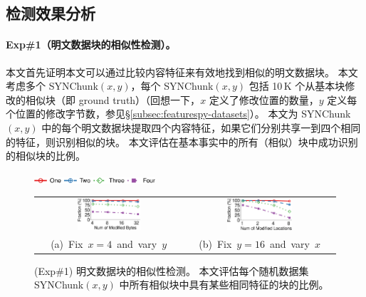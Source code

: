 \subsection{检测效果分析}
\label{subsec:featurespy-evaluation-detection}



\paragraph*{Exp\#1（明文数据块的相似性检测）。}
本文首先证明本文可以通过比较内容特征来有效地找到相似的明文数据块。 本文考虑多个 SYNChunk$(x, y)$，每个 SYNChunk$(x, y)$ 包括 10\,K 个从基本块修改的相似块（即 ground truth）（回想一下，$x$ 定义了修改位置的数量，$y$ 定义每个位置的修改字节数，参见\S\ref{subsec:featurespy-datasets}）。 本文为 SYNChunk$(x, y)$ 中的每个明文数据块提取四个内容特征，如果它们分别共享一到四个相同的特征，则识别相似的块。 本文评估在基本事实中的所有（相似）块中成功识别的相似块的比例。


\begin{figure}[t]
    \centering
    \includegraphics[width=0.4\textwidth]{pic/featurespy/plot/detection/syn/fixed_pq_legend.pdf}
    \vspace{5pt}\\
    \begin{tabular}{@{\ }c@{\ }c}
        \includegraphics[width=0.45\textwidth]{pic/featurespy/plot/detection/syn/fixed_p_4.pdf} &
        \includegraphics[width=0.45\textwidth]{pic/featurespy/plot/detection/syn/fixed_q_16.pdf}\\
        \mbox{\small (a) Fix $x=4$ and vary $y$}&
        \mbox{\small (b) Fix $y=16$ and vary $x$}\\
    \end{tabular}
    \vspace{-6pt}
    \caption{(Exp\#1) 明文数据块的相似性检测。 本文评估每个随机数据集 SYNChunk$(x, y)$ 中所有相似块中具有某些相同特征的块的比例。}
    \vspace{-6pt}
    \label{fig:featurespy-expDetectionSynSim}
\end{figure}

